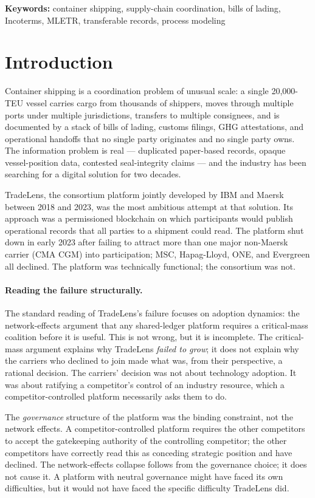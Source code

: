 \documentclass[11pt,a4paper]{article}
\theoremstyle{definition}
\theoremstyle{remark}
\begin{document}
\medskip
\noindent\textbf{Keywords:}
container shipping, supply-chain coordination, bills of lading,
Incoterms, MLETR, transferable records, process modeling

\section{Introduction}
\label{sec:intro}

Container shipping is a coordination problem of unusual scale: a
single 20{,}000-TEU vessel carries cargo from thousands of shippers,
moves through multiple ports under multiple jurisdictions, transfers
to multiple consignees, and is documented by a stack of bills of
lading, customs filings, GHG attestations, and operational handoffs
that no single party originates and no single party owns. The
information problem is real --- duplicated paper-based records,
opaque vessel-position data, contested seal-integrity claims --- and
the industry has been searching for a digital solution for two
decades.

TradeLens, the consortium platform jointly developed by IBM and
Maersk between 2018 and 2023, was the most ambitious attempt at
that solution. Its approach was a permissioned blockchain on which
participants would publish operational records that all parties to
a shipment could read. The platform shut down in early 2023 after
failing to attract more than one major non-Maersk carrier (CMA CGM)
into participation; MSC, Hapag-Lloyd, ONE, and Evergreen all
declined. The platform was technically functional; the consortium
was not.

\paragraph{Reading the failure structurally.}
The standard reading of TradeLens's failure focuses on adoption
dynamics: the network-effects argument that any shared-ledger
platform requires a critical-mass coalition before it is useful.
This is not wrong, but it is incomplete. The critical-mass argument
explains why TradeLens \emph{failed to grow}; it does not explain
why the carriers who declined to join made what was, from their
perspective, a rational decision. The carriers' decision was not
about technology adoption. It was about ratifying a competitor's
control of an industry resource, which a competitor-controlled
platform necessarily asks them to do.

The \emph{governance} structure of the platform was the binding
constraint, not the network effects. A competitor-controlled
platform requires the other competitors to accept the gatekeeping
authority of the controlling competitor; the other competitors
have correctly read this as conceding strategic position and have
declined. The network-effects collapse follows from the governance
choice; it does not cause it. A platform with neutral governance
might have faced its own difficulties, but it would not have faced
the specific difficulty TradeLens did.
\end{document}
